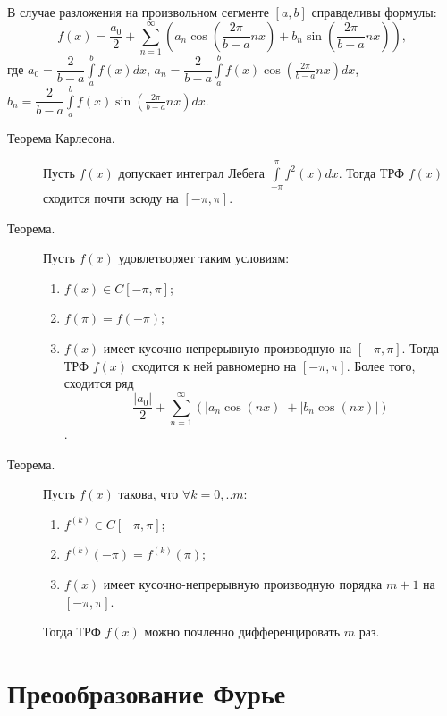 \documentclass[a4paper,12pt]{scrartcl}
\begin{document}
В случае разложения на произвольном сегменте $[a,b]$ справделивы формулы:
$$f(x) = \frac{a_0}{2}+\sum\limits_{n=1}^{\infty} \left( a_n\cos\left( \frac{2\pi}{b-a}nx\right) + b_n\sin\left( \frac{2\pi}{b-a}nx\right) \right),$$ 
где $a_0 = \dfrac{2}{b-a}\int\limits_{a}^{b}f(x)dx$, $a_n = \dfrac{2}{b-a}\int\limits_{a}^{b}f(x)\cos\left( \frac{2\pi}{b-a}nx\right)dx$, $b_n = \dfrac{2}{b-a}\int\limits_{a}^{b}f(x)\sin\left( \frac{2\pi}{b-a}nx\right)dx$.
\begin{description}
\item[Теорема Карлесона.] Пусть $f(x)$ допускает интеграл Лебега $\int\limits_{-\pi}^{\pi}f^2(x)dx$. Тогда ТРФ $f(x)$ сходится почти всюду на $[-\pi,\pi]$.
\item[Теорема.] Пусть $f(x)$ удовлетворяет таким условиям:
\begin{enumerate}
 \item $f(x) \in C[-\pi,\pi]$;
 \item $f(\pi) = f(-\pi)$;
 \item $f(x)$ имеет кусочно-непрерывную производную на $[-\pi,\pi]$.
Тогда ТРФ $f(x)$ сходится к ней равномерно на $[-\pi,\pi]$. Более того, сходится ряд 
$$\frac{|a_0|}{2}+\sum\limits_{n=1}^{\infty}(|a_n\cos(nx)| + |b_n\cos(nx)|)$$.
\end{enumerate} 
\item[Теорема.] Пусть $f(x)$ такова, что $\forall k = 0,..m $:
\begin{enumerate}
 \item $f^{(k)} \in C[-\pi,\pi]$;
 \item $f^{(k)}(-\pi) = f^{(k)}(\pi)$;
 \item $f(x)$ имеет кусочно-непрерывную производную порядка $m+1$ на $[-\pi,\pi]$. 
\end{enumerate}

Тогда ТРФ $f(x)$ можно почленно дифференцировать $m$ раз.
\end{description}

\section{Преообразование Фурье}
\end{document}
